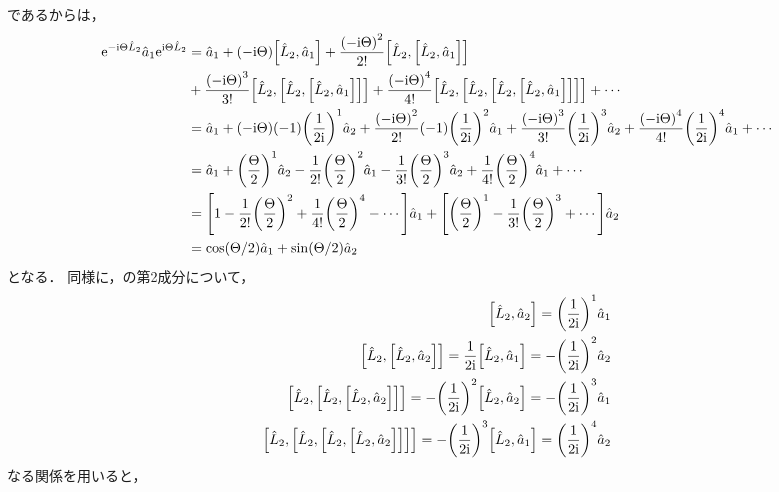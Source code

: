\documentclass{report}
\begin{document}
    であるからは，
    \begin{align}
      \mathrm{e}^{-\mathrm{i}\Theta\hat{L}_2}\hat{a}_1\mathrm{e}^{\mathrm{i}\Theta\hat{L}_2} &= \hat{a}_1 + \qty(-\mathrm{i}\Theta)\qty[\hat{L}_2, \hat{a}_1] + \frac{\qty(-\mathrm{i}\Theta)^2}{2!}\qty[\hat{L}_2, \qty[\hat{L}_2, \hat{a}_1]]\notag \\ 
      &+ \frac{\qty(-\mathrm{i}\Theta)^3}{3!}\qty[\hat{L}_2, \qty[\hat{L}_2, \qty[\hat{L}_2, \hat{a}_1]]] + \frac{\qty(-\mathrm{i}\Theta)^4}{4!}\qty[\hat{L}_2, \qty[\hat{L}_2, \qty[\hat{L}_2, \qty[\hat{L}_2, \hat{a}_1]]]] + \cdots \\ 
      &= \hat{a}_1 + \qty(-\mathrm{i}\Theta)\qty(-1)\qty(\frac{1}{2\mathrm{i}})^1\hat{a}_2 + \frac{\qty(-\mathrm{i}\Theta)^2}{2!}\qty(-1)\qty(\frac{1}{2\mathrm{i}})^2\hat{a}_1 + \frac{\qty(-\mathrm{i}\Theta)^3}{3!}\qty(\frac{1}{2\mathrm{i}})^3\hat{a}_2 + \frac{\qty(-\mathrm{i}\Theta)^4}{4!}\qty(\frac{1}{2\mathrm{i}})^4\hat{a}_1 + \cdots \\ 
      &= \hat{a}_1 + \qty(\frac{\Theta}{2})^1\hat{a}_2 - \frac{1}{2!}\qty(\frac{\Theta}{2})^2\hat{a}_1 - \frac{1}{3!}\qty(\frac{\Theta}{2})^3\hat{a}_2 + \frac{1}{4!}\qty(\frac{\Theta}{2})^4\hat{a}_1 + \cdots \\ 
      &= \qty[1 - \frac{1}{2!}\qty(\frac{\Theta}{2})^2 + \frac{1}{4!}\qty(\frac{\Theta}{2})^4 - \cdots]\hat{a}_1 + \qty[\qty(\frac{\Theta}{2})^1 - \frac{1}{3!}\qty(\frac{\Theta}{2})^3 + \cdots]\hat{a}_2 \\ 
      &= \cos(\Theta / 2)\hat{a}_1 + \sin(\Theta / 2)\hat{a}_2
    \end{align}
    となる．
    同様に，の第2成分について，
    \begin{align}
      \qty[\hat{L}_2, \hat{a}_2] = \qty(\frac{1}{2\mathrm{i}})^1\hat{a}_1 \\ 
      \qty[\hat{L}_2, \qty[\hat{L}_2, \hat{a}_2]] = \frac{1}{2\mathrm{i}}\qty[\hat{L}_2, \hat{a}_1] = -\qty(\frac{1}{2\mathrm{i}})^2\hat{a}_2 \\ 
      \qty[\hat{L}_2, \qty[\hat{L}_2, \qty[\hat{L}_2, \hat{a}_2]]] = -\qty(\frac{1}{2\mathrm{i}})^2\qty[\hat{L}_2, \hat{a}_2] = -\qty(\frac{1}{2\mathrm{i}})^3\hat{a}_1 \\ 
      \qty[\hat{L}_2, \qty[\hat{L}_2, \qty[\hat{L}_2, \qty[\hat{L}_2, \hat{a}_2]]]] = -\qty(\frac{1}{2\mathrm{i}})^3\qty[\hat{L}_2, \hat{a}_1] = \qty(\frac{1}{2\mathrm{i}})^4\hat{a}_2
    \end{align}
    なる関係を用いると，
\end{document}
